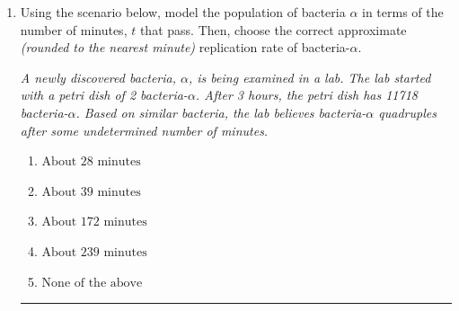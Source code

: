 \documentclass[14pt]{extbook}
\newcommand{\litem}[1]{\item#1\hspace*{-1cm}\rule{\textwidth}{0.4pt}}
\begin{document}
\begin{enumerate}
{\begin{enumerate}[label=\Alph*.]
\end{enumerate} }
\litem{
Using the scenario below, model the population of bacteria $\alpha$ in terms of the number of minutes, $t$ that pass. Then, choose the correct approximate \textit{(rounded to the nearest minute)} replication rate of bacteria-$\alpha$.
\begin{center}
    \textit{ A newly discovered bacteria, $\alpha$, is being examined in a lab. The lab started with a petri dish of 2 bacteria-$\alpha$. After 3 hours, the petri dish has 11718 bacteria-$\alpha$. Based on similar bacteria, the lab believes bacteria-$\alpha$ quadruples after some undetermined number of minutes. }
\end{center}
\begin{enumerate}[label=\Alph*.]
\item \( \text{About } 28 \text{ minutes} \)
\item \( \text{About } 39 \text{ minutes} \)
\item \( \text{About } 172 \text{ minutes} \)
\item \( \text{About } 239 \text{ minutes} \)
\item \( \text{None of the above} \)

\end{enumerate} }
\end{enumerate}
\end{document}
